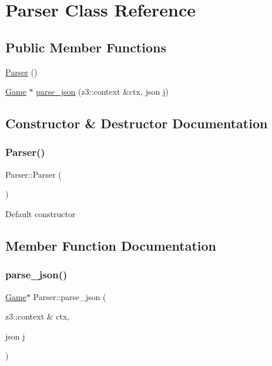 \hypertarget{classParser}{}\section{Parser Class Reference}
\label{classParser}
\subsection*{Public Member Functions}
\begin{DoxyCompactItemize}
\item 
\hyperlink{classParser_a12234f6cd36b61af4b50c94a179422c1}{Parser} ()
\item 
\hyperlink{classGame}{Game} $\ast$ \hyperlink{classParser_af5d6b54b01350e7981b01e8d122c8e51}{parse\+\_\+json} (z3\+::context \&ctx, json j)
\end{DoxyCompactItemize}


\subsection{Constructor \& Destructor Documentation}
\mbox{\label{classParser_a12234f6cd36b61af4b50c94a179422c1}} 
\subsubsection{\texorpdfstring{Parser()}{Parser()}}
{\footnotesize\ttfamily Parser\+::\+Parser (\begin{DoxyParamCaption}{ }\end{DoxyParamCaption})\hspace{0.3cm}{\ttfamily [inline]}}

Default constructor 

\subsection{Member Function Documentation}
\mbox{\label{classParser_af5d6b54b01350e7981b01e8d122c8e51}} 
\subsubsection{\texorpdfstring{parse\+\_\+json()}{parse\_json()}}
{\footnotesize\ttfamily \hyperlink{classGame}{Game}$\ast$ Parser\+::parse\+\_\+json (\begin{DoxyParamCaption}\item[{z3\+::context \&}]{ctx,  }\item[{json}]{j }\end{DoxyParamCaption})\hspace{0.3cm}{\ttfamily [inline]}}

